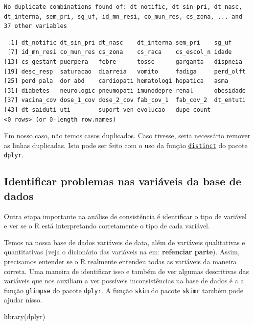 \documentclass[
  letterpaper,
  DIV=11,
  numbers=noendperiod]{scrreprt}
\newenvironment{Shaded}{\begin{snugshade}}{\end{snugshade}}
\newcommand{\FunctionTok}[1]{\textcolor[rgb]{0.28,0.35,0.67}{#1}}
\newcommand{\NormalTok}[1]{\textcolor[rgb]{0.00,0.23,0.31}{#1}}
\begin{document}
\begin{verbatim}
No duplicate combinations found of: dt_notific, dt_sin_pri, dt_nasc, dt_interna, sem_pri, sg_uf, id_mn_resi, co_mun_res, cs_zona, ... and 37 other variables
\end{verbatim}

\begin{verbatim}
 [1] dt_notific dt_sin_pri dt_nasc    dt_interna sem_pri    sg_uf     
 [7] id_mn_resi co_mun_res cs_zona    cs_raca    cs_escol_n idade     
[13] cs_gestant puerpera   febre      tosse      garganta   dispneia  
[19] desc_resp  saturacao  diarreia   vomito     fadiga     perd_olft 
[25] perd_pala  dor_abd    cardiopati hematologi hepatica   asma      
[31] diabetes   neurologic pneumopati imunodepre renal      obesidade 
[37] vacina_cov dose_1_cov dose_2_cov fab_cov_1  fab_cov_2  dt_entuti 
[43] dt_saiduti uti        suport_ven evolucao   dupe_count
<0 rows> (or 0-length row.names)
\end{verbatim}

Em nosso caso, não temos casos duplicados. Caso tivesse, seria
necessário remover as linhas duplicadas. Isto pode ser feito com o uso
da função
\href{https://dplyr.tidyverse.org/reference/distinct.html}{\texttt{distinct}}
do pacote \texttt{dplyr}.

\hypertarget{identificar-problemas-nas-variuxe1veis-da-base-de-dados}{%
\subsection{Identificar problemas nas variáveis da base de
dados}\label{identificar-problemas-nas-variuxe1veis-da-base-de-dados}}

Outra etapa importante na análise de consistência é identificar o tipo
de variável e ver se o R está interpretando corretamente o tipo de cada
variável.

Temos na nossa base de dados variáveis de data, além de variáveis
qualitativas e quantitativas (veja o dicionário das variáveis na em:
\textbf{refenciar parte}). Assim, precisamos entender se o R realmente
entendeu todas as variáveis da maneira correta. Uma maneira de
identificar isso e também de ver algumas descritivas das variáveis que
nos auxiliam a ver possíveis inconsistências na base de dados é a a
função \texttt{glimpse} do pacote \texttt{dplyr}. A função \texttt{skim}
do pacote \texttt{skimr} também pode ajudar nisso.

\begin{Shaded}
\begin{Highlighting}[]
\FunctionTok{library}\NormalTok{(dplyr)}
\end{Highlighting}
\end{Shaded}
\end{document}
